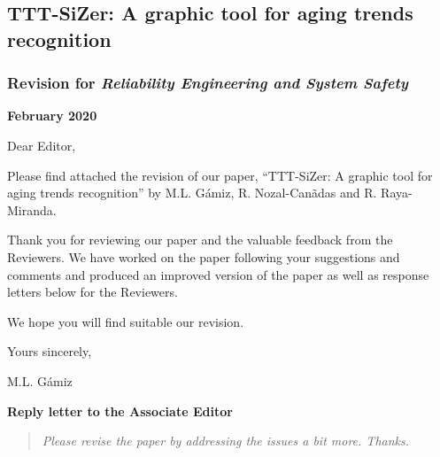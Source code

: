 \documentclass[12pt]{article}
\begin{document}
\begin{center}
 {\Large\bf }
\vskip 0.2cm

\subsection* {TTT-SiZer: A graphic tool for aging trends recognition}
\subsubsection*{Revision for {\em Reliability Engineering and System Safety}}
\vskip 0.2cm

{\bf February 2020}
\end{center}
\vskip 0.5cm

\date{\ }

\noindent Dear Editor, \vskip 0.3cm

\noindent Please find attached the revision of our paper, ``TTT-SiZer: A graphic tool for aging trends recognition'' by M.L. G\'amiz, R. Nozal-Can\~adas and R. Raya-Miranda.
\bigskip

Thank you for reviewing our paper and the valuable feedback from the Reviewers. We have worked on the paper following your suggestions and comments and produced an improved version of the paper as well as response letters below for the Reviewers.

\bigskip

We hope you will find suitable our revision. 
\bigskip

\vskip 0.3cm
\noindent Yours sincerely,

M.L. G\'amiz

\vskip 0.5cm
\newpage
\date{\ }
{\centerline {\bf \large Reply letter to the Associate Editor}}
\vskip 1cm
 

\begin{quote}
\emph{ Please revise the paper by addressing the issues a bit more. Thanks.}

\end{quote}
\end{document}
